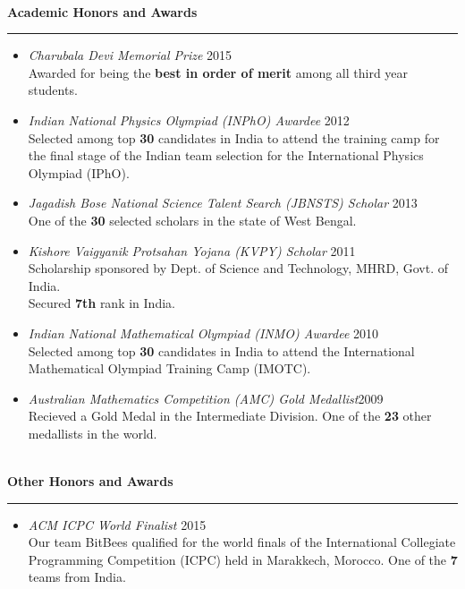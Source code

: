 \documentclass[a4paper,10pt,oneside]{article}
\newcommand{\heading}[1]{
 {\Large \textbf{#1}}
  \vspace{0.4em}
  \hrule
  \vspace{0.4em}
}
\newcommand{\EntryGap}{ ~\\ }
\begin{document}

\EntryGap
\heading{Academic Honors and Awards}
\begin{itemize}
 \setlength{\itemsep}{0.0em}
 \item \emph{Charubala Devi Memorial Prize} \hfill 2015\\
Awarded for being the \textbf{best in order of merit} among all third year students.
\item \emph{Indian National Physics Olympiad (INPhO) Awardee} \hfill 2012\\
Selected among top \textbf{30} candidates in India to attend the training camp for the final stage of the Indian team selection for the International Physics Olympiad (IPhO).
\item \emph{Jagadish Bose National Science Talent Search (JBNSTS) Scholar} \hfill 2013\\
One of the \textbf{30} selected scholars in the state of West Bengal.
\item\emph{Kishore Vaigyanik Protsahan Yojana (KVPY) Scholar} \hfill 2011\\
Scholarship sponsored by Dept. of Science and Technology, MHRD, Govt. of India.\\
Secured \textbf{7th} rank in India.
\item\emph{Indian National Mathematical Olympiad (INMO) Awardee} \hfill 2010\\
Selected among top \textbf{30} candidates in India to attend the International Mathematical Olympiad Training Camp (IMOTC).
\item\emph{Australian Mathematics Competition (AMC) Gold Medallist}\hfill 2009\\
Recieved a Gold Medal in the Intermediate Division. One of the \textbf{23} other medallists in the world.
\end{itemize}


\EntryGap
\heading{Other Honors and Awards}
\begin{itemize}
\item \emph{ACM ICPC World Finalist} \hfill 2015\\
Our team BitBees qualified for the world finals of the International Collegiate Programming Competition (ICPC) held in Marakkech, Morocco. One of the \textbf{7} teams from India.
\end{itemize}
\end{document}
